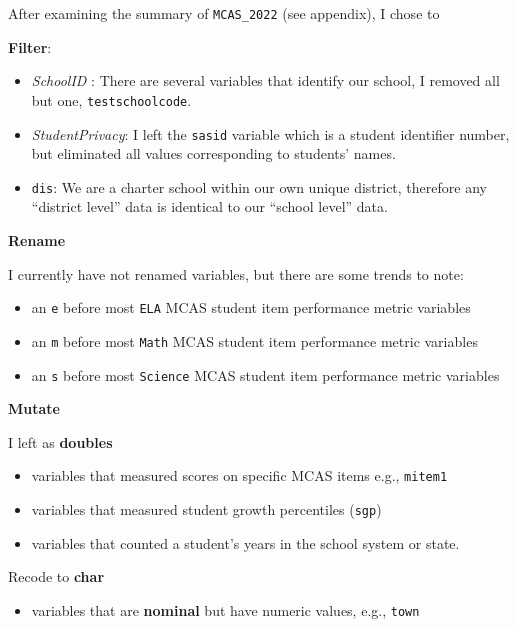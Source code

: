 \documentclass[
  letterpaper,
  DIV=11,
  numbers=noendperiod]{scrartcl}
\providecommand{\tightlist}{%
  \setlength{\itemsep}{0pt}\setlength{\parskip}{0pt}}\usepackage{longtable,booktabs,array}
\begin{document}
After examining the summary of \texttt{MCAS\_2022} (see appendix), I
chose to

\textbf{Filter}:

\begin{itemize}
\item
  \emph{SchoolID} : There are several variables that identify our
  school, I removed all but one, \texttt{testschoolcode}.
\item
  \emph{StudentPrivacy}: I left the \texttt{sasid} variable which is a
  student identifier number, but eliminated all values corresponding to
  students' names.
\item
  \texttt{dis}: We are a charter school within our own unique district,
  therefore any ``district level'' data is identical to our ``school
  level'' data.
\end{itemize}

\textbf{Rename}

I currently have not renamed variables, but there are some trends to
note:

\begin{itemize}
\tightlist
\item
  an \texttt{e} before most \texttt{ELA} MCAS student item performance
  metric variables
\item
  an \texttt{m} before most \texttt{Math} MCAS student item performance
  metric variables
\item
  an \texttt{s} before most \texttt{Science} MCAS student item
  performance metric variables
\end{itemize}

\textbf{Mutate}

I left as \textbf{doubles}

\begin{itemize}
\tightlist
\item
  variables that measured scores on specific MCAS items e.g.,
  \texttt{mitem1}
\item
  variables that measured student growth percentiles (\texttt{sgp})
\item
  variables that counted a student's years in the school system or
  state.
\end{itemize}

Recode to \textbf{char}

\begin{itemize}
\tightlist
\item
  variables that are \textbf{nominal} but have numeric values, e.g.,
  \texttt{town}
\end{itemize}
\end{document}

